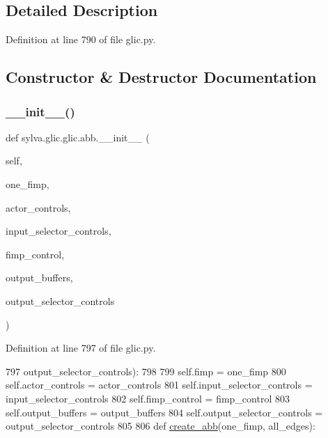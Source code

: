 \subsection{Detailed Description}


Definition at line 790 of file glic.\+py.



\subsection{Constructor \& Destructor Documentation}
\mbox{\label{classsylva_1_1glic_1_1glic_1_1abb_aa11318390c0aca19b3960f881322cf2e}} 
\subsubsection{\texorpdfstring{\+\_\+\+\_\+init\+\_\+\+\_\+()}{\_\_init\_\_()}}
{\footnotesize\ttfamily def sylva.\+glic.\+glic.\+abb.\+\_\+\+\_\+init\+\_\+\+\_\+ (\begin{DoxyParamCaption}\item[{}]{self,  }\item[{}]{one\+\_\+fimp,  }\item[{}]{actor\+\_\+controls,  }\item[{}]{input\+\_\+selector\+\_\+controls,  }\item[{}]{fimp\+\_\+control,  }\item[{}]{output\+\_\+buffers,  }\item[{}]{output\+\_\+selector\+\_\+controls }\end{DoxyParamCaption})}



Definition at line 797 of file glic.\+py.


\begin{DoxyCode}
797                      output\_selector\_controls):
798 
799             self.fimp = one\_fimp
800             self.actor\_controls = actor\_controls
801             self.input\_selector\_controls = input\_selector\_controls
802             self.fimp\_control = fimp\_control
803             self.output\_buffers = output\_buffers
804             self.output\_selector\_controls = output\_selector\_controls
805 
806     \textcolor{keyword}{def }\hyperlink{namespacesylva_1_1glic_1_1glic_a3a984424c11a0b4b6ac8890135ccbfe9}{create\_abb}(one\_fimp, all\_edges):
\end{DoxyCode}


